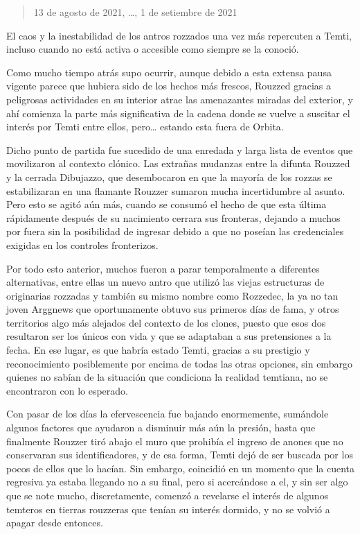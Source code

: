 \documentclass[
  spanish,
]{book}
\begin{document}
\begin{quote}
13 de agosto de 2021, \ldots, 1 de setiembre de 2021
\end{quote}

El caos y la inestabilidad de los antros rozzados una vez más repercuten a Temti, incluso cuando no está activa o accesible como siempre se la conoció.

Como mucho tiempo atrás supo ocurrir, aunque debido a esta extensa pausa vigente parece que hubiera sido de los hechos más frescos, Rouzzed gracias a peligrosas actividades en su interior atrae las amenazantes miradas del exterior, y ahí comienza la parte más significativa de la cadena donde se vuelve a suscitar el interés por Temti entre ellos, pero\ldots{} estando esta fuera de Orbita.

Dicho punto de partida fue sucedido de una enredada y larga lista de eventos que movilizaron al contexto clónico. Las extrañas mudanzas entre la difunta Rouzzed y la cerrada Dibujazzo, que desembocaron en que la mayoría de los rozzas se estabilizaran en una flamante Rouzzer sumaron mucha incertidumbre al asunto. Pero esto se agitó aún más, cuando se consumó el hecho de que esta última rápidamente después de su nacimiento cerrara sus fronteras, dejando a muchos por fuera sin la posibilidad de ingresar debido a que no poseían las credenciales exigidas en los controles fronterizos.

Por todo esto anterior, muchos fueron a parar temporalmente a diferentes alternativas, entre ellas un nuevo antro que utilizó las viejas estructuras de originarias rozzadas y también su mismo nombre como Rozzedec, la ya no tan joven Arggnews que oportunamente obtuvo sus primeros días de fama, y otros territorios algo más alejados del contexto de los clones, puesto que esos dos resultaron ser los únicos con vida y que se adaptaban a sus pretensiones a la fecha. En ese lugar, es que habría estado Temti, gracias a su prestigio y reconocimiento posiblemente por encima de todas las otras opciones, sin embargo quienes no sabían de la situación que condiciona la realidad temtiana, no se encontraron con lo esperado.

Con pasar de los días la efervescencia fue bajando enormemente, sumándole algunos factores que ayudaron a disminuir más aún la presión, hasta que finalmente Rouzzer tiró abajo el muro que prohibía el ingreso de anones que no conservaran sus identificadores, y de esa forma, Temti dejó de ser buscada por los pocos de ellos que lo hacían. Sin embargo, coincidió en un momento que la cuenta regresiva ya estaba llegando no a su final, pero si acercándose a el, y sin ser algo que se note mucho, discretamente, comenzó a revelarse el interés de algunos temteros en tierras rouzzeras que tenían su interés dormido, y no se volvió a apagar desde entonces.
\end{document}
